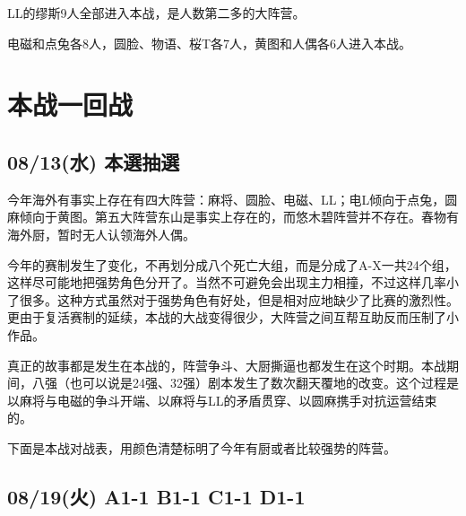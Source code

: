 LL的缪斯9人全部进入本战，是人数第二多的大阵营。

电磁和点兔各8人，圆脸、物语、桜T各7人，黄图和人偶各6人进入本战。

\chapter{本战一回战}

\section{08/13(水) 本選抽選}

今年海外有事实上存在有四大阵营：麻将、圆脸、电磁、LL；电L倾向于点兔，圆麻倾向于黄图。第五大阵营东山是事实上存在的，而悠木碧阵营并不存在。春物有海外厨，暂时无人认领海外人偶。

今年的赛制发生了变化，不再划分成八个死亡大组，而是分成了A-X一共24个组，这样尽可能地把强势角色分开了。当然不可避免会出现主力相撞，不过这样几率小了很多。这种方式虽然对于强势角色有好处，但是相对应地缺少了比赛的激烈性。更由于复活赛制的延续，本战的大战变得很少，大阵营之间互帮互助反而压制了小作品。

真正的故事都是发生在本战的，阵营争斗、大厨撕逼也都发生在这个时期。本战期间，八强（也可以说是24强、32强）剧本发生了数次翻天覆地的改变。这个过程是以麻将与电磁的争斗开端、以麻将与LL的矛盾贯穿、以圆麻携手对抗运营结束的。

下面是本战对战表，用颜色清楚标明了今年有厨或者比较强势的阵营。


\section{08/19(火) A1-1 B1-1 C1-1 D1-1}


